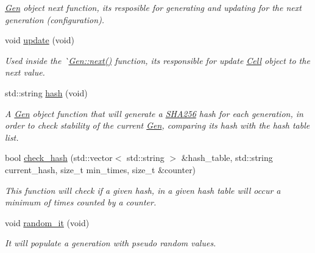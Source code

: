 \begin{DoxyCompactItemize}
\begin{DoxyCompactList}\small\item\em \mbox{\hyperlink{class_gen}{Gen}} object next function, it\textquotesingle{}s resposible for generating and updating for the next generation (configuration). \end{DoxyCompactList}\item 
\mbox{\label{class_gen_ae5caf53dba7416a655a8d7a2b0456834}} 
void \mbox{\hyperlink{class_gen_ae5caf53dba7416a655a8d7a2b0456834}{update}} (void)
\begin{DoxyCompactList}\small\item\em Used inside the \`{}{\ttfamily \mbox{\hyperlink{class_gen_a98cf94512490100bc8fd5e68b4ebc4db}{Gen\+::next()}}} function, it\textquotesingle{}s responsible for update \mbox{\hyperlink{class_cell}{Cell}} object to the next value. \end{DoxyCompactList}\item 
\mbox{\label{class_gen_a478730331b639d3cfb3140c16bbc0976}} 
std\+::string \mbox{\hyperlink{class_gen_a478730331b639d3cfb3140c16bbc0976}{hash}} (void)
\begin{DoxyCompactList}\small\item\em A \mbox{\hyperlink{class_gen}{Gen}} object function that will generate a \mbox{\hyperlink{class_s_h_a256}{S\+H\+A256}} hash for each generation, in order to check stability of the current \mbox{\hyperlink{class_gen}{Gen}}, comparing it\textquotesingle{}s hash with the hash table list. \end{DoxyCompactList}\item 
bool \mbox{\hyperlink{class_gen_a5886e4217cee1c1ad080e23134e8210a}{check\+\_\+hash}} (std\+::vector$<$ std\+::string $>$ \&hash\+\_\+table, std\+::string current\+\_\+hash, size\+\_\+t min\+\_\+times, size\+\_\+t \&counter)
\begin{DoxyCompactList}\small\item\em This function will check if a given hash, in a given hash table will occur a minimum of times counted by a counter. \end{DoxyCompactList}\item 
\mbox{\label{class_gen_adf50e03aa69e3bafb2627740621f1c63}} 
void \mbox{\hyperlink{class_gen_adf50e03aa69e3bafb2627740621f1c63}{random\+\_\+it}} (void)
\begin{DoxyCompactList}\small\item\em It will populate a generation with pseudo random values. \end{DoxyCompactList}\item 

\end{DoxyCompactItemize}
